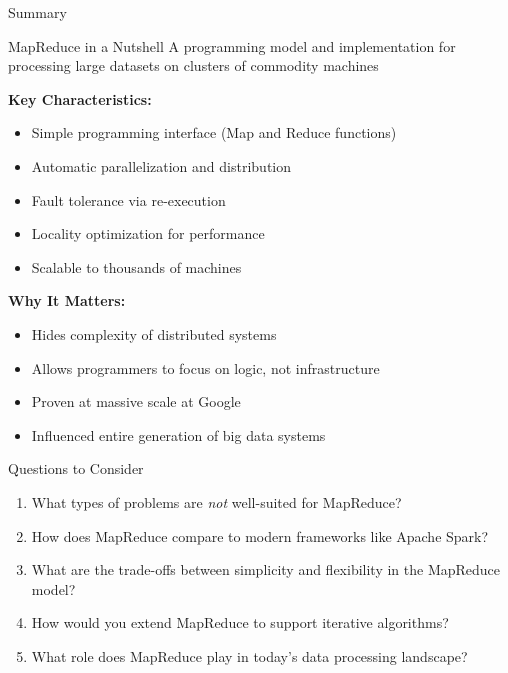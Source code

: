 \documentclass[aspectratio=169]{beamer}
\begin{document}
\begin{frame}{Summary}
\begin{block}{MapReduce in a Nutshell}
A programming model and implementation for processing large datasets on clusters of commodity machines
\end{block}

\vspace{0.3cm}

\textbf{Key Characteristics:}
\begin{itemize}
    \item Simple programming interface (Map and Reduce functions)
    \item Automatic parallelization and distribution
    \item Fault tolerance via re-execution
    \item Locality optimization for performance
    \item Scalable to thousands of machines
\end{itemize}

\vspace{0.3cm}

\textbf{Why It Matters:}
\begin{itemize}
    \item Hides complexity of distributed systems
    \item Allows programmers to focus on logic, not infrastructure
    \item Proven at massive scale at Google
    \item Influenced entire generation of big data systems
\end{itemize}
\end{frame}

\begin{frame}{Questions to Consider}
\begin{enumerate}
    \item What types of problems are \textit{not} well-suited for MapReduce?

    \vspace{0.3cm}

    \item How does MapReduce compare to modern frameworks like Apache Spark?

    \vspace{0.3cm}

    \item What are the trade-offs between simplicity and flexibility in the MapReduce model?

    \vspace{0.3cm}

    \item How would you extend MapReduce to support iterative algorithms?

    \vspace{0.3cm}

    \item What role does MapReduce play in today's data processing landscape?
\end{enumerate}
\end{frame}
\end{document}
